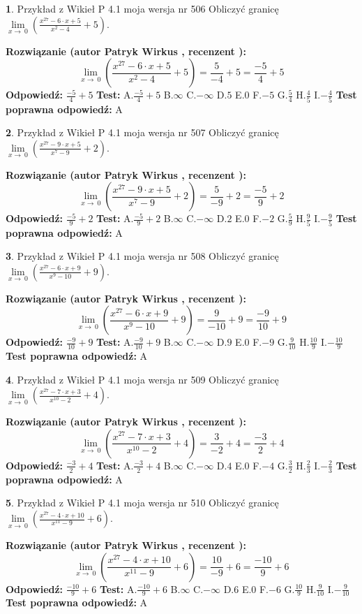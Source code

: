 \documentclass[12pt, a4paper]{article}
\theoremstyle{definition} %
\newtheorem{zad}{}
\newcommand{\zadStart}[1]{\begin{zad}#1\newline}
\newcommand{\zadStop}{\end{zad}}
\newcommand{\rozwStart}[2]{\noindent \textbf{Rozwiązanie (autor #1 , recenzent #2): }\newline}
\newcommand{\rozwStop}{\newline}
\newcommand{\odpStart}{\noindent \textbf{Odpowiedź:}\newline}
\newcommand{\odpStop}{\newline}
\newcommand{\testStart}{\noindent \textbf{Test:}\newline}
\newcommand{\testStop}{\newline}
\newcommand{\kluczStart}{\noindent \textbf{Test poprawna odpowiedź:}\newline}
\newcommand{\kluczStop}{\newline}
\begin{document}
\zadStart{Przykład z Wikieł P 4.1 moja wersja nr 506}
Obliczyć granicę $\lim\limits_{x\to\ 0}(\frac{x^{27}-6 \cdot x +5}{x^{2}-4}+5)$.
\zadStop
\rozwStart{Patryk Wirkus}{}
$$\lim\limits_{x\to\ 0}(\frac{x^{27}-6 \cdot x +5}{x^{2}-4}+5)=\frac{5}{-4}+5=\frac{-5}{4}+5$$
\rozwStop
\odpStart
$\frac{-5}{4}+5$
\odpStop
\testStart
A.$\frac{-5}{4}+5$
B.$\infty$
C.$-\infty$
D.$5$
E.$0$
F.$-5$
G.$\frac{5}{4}$
H.$\frac{4}{5}$
I.$-\frac{4}{5}$
\testStop
\kluczStart
A
\kluczStop



\zadStart{Przykład z Wikieł P 4.1 moja wersja nr 507}
Obliczyć granicę $\lim\limits_{x\to\ 0}(\frac{x^{27}-9 \cdot x +5}{x^{7}-9}+2)$.
\zadStop
\rozwStart{Patryk Wirkus}{}
$$\lim\limits_{x\to\ 0}(\frac{x^{27}-9 \cdot x +5}{x^{7}-9}+2)=\frac{5}{-9}+2=\frac{-5}{9}+2$$
\rozwStop
\odpStart
$\frac{-5}{9}+2$
\odpStop
\testStart
A.$\frac{-5}{9}+2$
B.$\infty$
C.$-\infty$
D.$2$
E.$0$
F.$-2$
G.$\frac{5}{9}$
H.$\frac{9}{5}$
I.$-\frac{9}{5}$
\testStop
\kluczStart
A
\kluczStop



\zadStart{Przykład z Wikieł P 4.1 moja wersja nr 508}
Obliczyć granicę $\lim\limits_{x\to\ 0}(\frac{x^{27}-6 \cdot x +9}{x^{9}-10}+9)$.
\zadStop
\rozwStart{Patryk Wirkus}{}
$$\lim\limits_{x\to\ 0}(\frac{x^{27}-6 \cdot x +9}{x^{9}-10}+9)=\frac{9}{-10}+9=\frac{-9}{10}+9$$
\rozwStop
\odpStart
$\frac{-9}{10}+9$
\odpStop
\testStart
A.$\frac{-9}{10}+9$
B.$\infty$
C.$-\infty$
D.$9$
E.$0$
F.$-9$
G.$\frac{9}{10}$
H.$\frac{10}{9}$
I.$-\frac{10}{9}$
\testStop
\kluczStart
A
\kluczStop



\zadStart{Przykład z Wikieł P 4.1 moja wersja nr 509}
Obliczyć granicę $\lim\limits_{x\to\ 0}(\frac{x^{27}-7 \cdot x +3}{x^{10}-2}+4)$.
\zadStop
\rozwStart{Patryk Wirkus}{}
$$\lim\limits_{x\to\ 0}(\frac{x^{27}-7 \cdot x +3}{x^{10}-2}+4)=\frac{3}{-2}+4=\frac{-3}{2}+4$$
\rozwStop
\odpStart
$\frac{-3}{2}+4$
\odpStop
\testStart
A.$\frac{-3}{2}+4$
B.$\infty$
C.$-\infty$
D.$4$
E.$0$
F.$-4$
G.$\frac{3}{2}$
H.$\frac{2}{3}$
I.$-\frac{2}{3}$
\testStop
\kluczStart
A
\kluczStop



\zadStart{Przykład z Wikieł P 4.1 moja wersja nr 510}
Obliczyć granicę $\lim\limits_{x\to\ 0}(\frac{x^{27}-4 \cdot x +10}{x^{11}-9}+6)$.
\zadStop
\rozwStart{Patryk Wirkus}{}
$$\lim\limits_{x\to\ 0}(\frac{x^{27}-4 \cdot x +10}{x^{11}-9}+6)=\frac{10}{-9}+6=\frac{-10}{9}+6$$
\rozwStop
\odpStart
$\frac{-10}{9}+6$
\odpStop
\testStart
A.$\frac{-10}{9}+6$
B.$\infty$
C.$-\infty$
D.$6$
E.$0$
F.$-6$
G.$\frac{10}{9}$
H.$\frac{9}{10}$
I.$-\frac{9}{10}$
\testStop
\kluczStart
A
\kluczStop
\end{document}
